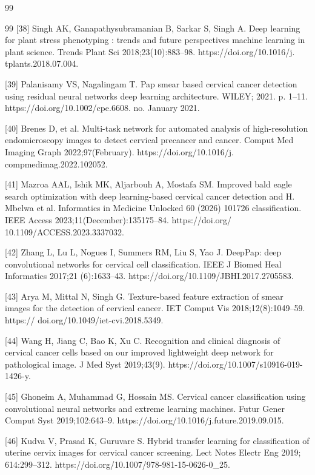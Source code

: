 \documentclass{svjour3}
\begin{document}
\begin{thebibliography}{99}
\begin{thebibliography}{99}
 [38] Singh AK, Ganapathysubramanian B, Sarkar S, Singh A. Deep learning for plant stress phenotyping : trends and future perspectives machine learning in plant science. Trends Plant Sci 2018;23(10):883–98. https://doi.org/10.1016/j. tplants.2018.07.004.

 [39] Palanisamy VS, Nagalingam T. Pap smear based cervical cancer detection using residual neural networks deep learning architecture. WILEY; 2021. p. 1–11. https://doi.org/10.1002/cpe.6608. no. January 2021.

 [40] Brenes D, et al. Multi-task network for automated analysis of high-resolution endomicroscopy images to detect cervical precancer and cancer. Comput Med Imaging Graph 2022;97(February). https://doi.org/10.1016/j. compmedimag.2022.102052.

 [41] Mazroa AAL, Ishik MK, Aljarbouh A, Mostafa SM. Improved bald eagle search optimization with deep learning-based cervical cancer detection and
H. Mbelwa et al. Informatics in Medicine Unlocked 60 (2026) 101726 classification. IEEE Access 2023;11(December):135175–84. https://doi.org/ 10.1109/ACCESS.2023.3337032.

 [42] Zhang L, Lu L, Nogues I, Summers RM, Liu S, Yao J. DeepPap: deep convolutional networks for cervical cell classification. IEEE J Biomed Heal Informatics 2017;21 (6):1633–43. https://doi.org/10.1109/JBHI.2017.2705583.

 [43] Arya M, Mittal N, Singh G. Texture-based feature extraction of smear images for the detection of cervical cancer. IET Comput Vis 2018;12(8):1049–59. https:// doi.org/10.1049/iet-cvi.2018.5349.

 [44] Wang H, Jiang C, Bao K, Xu C. Recognition and clinical diagnosis of cervical cancer cells based on our improved lightweight deep network for pathological image. J Med Syst 2019;43(9). https://doi.org/10.1007/s10916-019-1426-y.

 [45] Ghoneim A, Muhammad G, Hossain MS. Cervical cancer classification using convolutional neural networks and extreme learning machines. Futur Gener Comput Syst 2019;102:643–9. https://doi.org/10.1016/j.future.2019.09.015.

 [46] Kudva V, Prasad K, Guruvare S. Hybrid transfer learning for classification of uterine cervix images for cervical cancer screening. Lect Notes Electr Eng 2019; 614:299–312. https://doi.org/10.1007/978-981-15-0626-0\_25.


\end{thebibliography}
\end{thebibliography}
\end{document}
